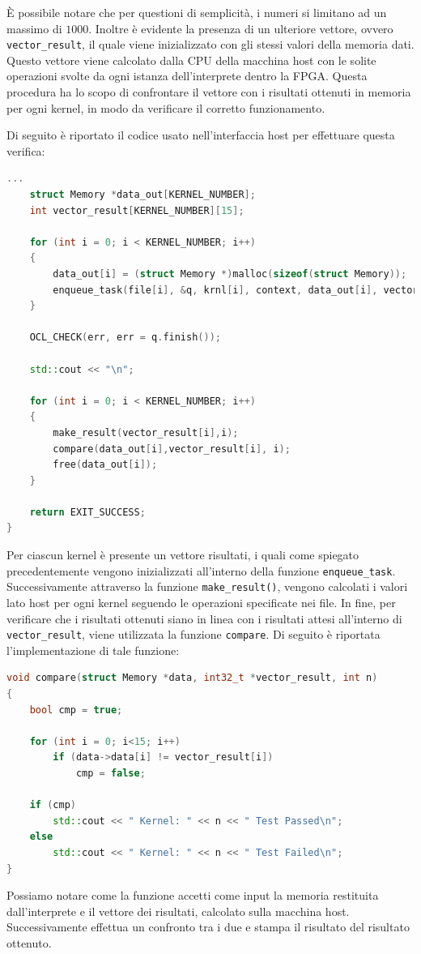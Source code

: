 È possibile notare che per questioni di semplicità, i numeri si limitano ad un massimo di $1000$. Inoltre è evidente la presenza di un ulteriore vettore,  ovvero \texttt{vector\_result}, il quale viene inizializzato con gli stessi valori della memoria dati. Questo vettore viene calcolato dalla CPU della macchina host con le solite operazioni svolte da ogni istanza dell'interprete dentro la FPGA. Questa procedura ha lo scopo di confrontare il vettore con i risultati ottenuti in memoria per ogni kernel, in modo da verificare il corretto funzionamento. 

\vspace{0.3cm}

\noindent Di seguito è riportato il codice usato nell'interfaccia host per effettuare questa verifica: 

\begin{lstlisting}[language=C++]
...
	struct Memory *data_out[KERNEL_NUMBER];
	int vector_result[KERNEL_NUMBER][15];

	for (int i = 0; i < KERNEL_NUMBER; i++)
	{
		data_out[i] = (struct Memory *)malloc(sizeof(struct Memory));
		enqueue_task(file[i], &q, krnl[i], context, data_out[i], vector_result[i]);
	}

	OCL_CHECK(err, err = q.finish());

	std::cout << "\n";

	for (int i = 0; i < KERNEL_NUMBER; i++)
	{
		make_result(vector_result[i],i);
		compare(data_out[i],vector_result[i], i);
		free(data_out[i]);
	}

	return EXIT_SUCCESS;
}
\end{lstlisting}

Per ciascun kernel è presente un vettore risultati, i quali come spiegato precedentemente vengono inizializzati all'interno della funzione \texttt{enqueue\_task}. Successivamente attraverso la funzione \texttt{make\_result()}, vengono calcolati i valori lato host per ogni kernel seguendo le operazioni specificate nei file. In fine, per verificare che i risultati ottenuti siano in linea con i risultati attesi all'interno di \texttt{vector\_result}, viene utilizzata la funzione \texttt{compare}. Di seguito è riportata l'implementazione di tale funzione:

\begin{lstlisting}[language=C++]
void compare(struct Memory *data, int32_t *vector_result, int n)
{
	bool cmp = true;

	for (int i = 0; i<15; i++) 
		if (data->data[i] != vector_result[i])
			cmp = false;

	if (cmp) 
		std::cout << " Kernel: " << n << " Test Passed\n";
	else 
		std::cout << " Kernel: " << n << " Test Failed\n";
}
\end{lstlisting}
Possiamo notare come la funzione accetti come input la memoria restituita dall'interprete e il vettore dei risultati, calcolato sulla macchina host. Successivamente effettua un confronto tra i due e stampa il risultato del risultato ottenuto.

